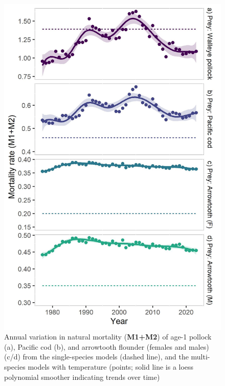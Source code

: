 \documentclass[
]{article}
\begin{document}
\begin{figure}
\centering
\includegraphics{Results/ESR_Fig1.jpg}
\caption{Annual variation in natural mortality (\textbf{M1+M2}) of age-1
pollock (a), Pacific cod (b), and arrowtooth flounder (females and
males) (c/d) from the single-species models (dashed line), and the
multi-species models with temperature (points; solid line is a loess
polynomial smoother indicating trends over time)}
\end{figure}
\end{document}
